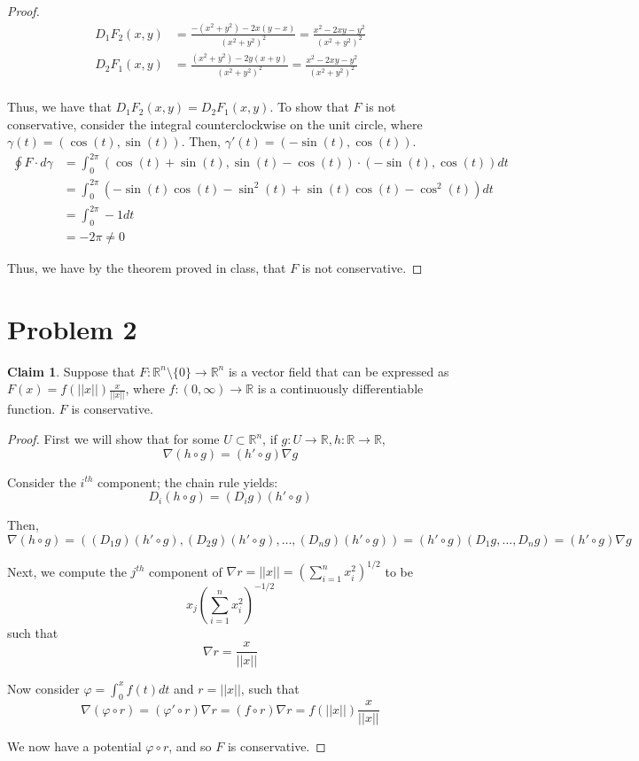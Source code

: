 \documentclass[12pt,letterpaper]{article}
\theoremstyle{definition}
\newtheorem*{claim}{Claim}
\newcommand{\R}{\mathbb{R}}
\begin{document}
\begin{proof}
  \begin{align*}
    D_1F_2(x,y) &= \frac{-(x^2 + y^2) - 2x(y-x)}{(x^2 + y^2)^2} = \frac{x^2 -2xy - y^2}{(x^2 + y^2)^2} \\
    D_2F_1(x,y) &= \frac{(x^2 + y^2) - 2y(x+y)}{(x^2 + y^2)^2} = \frac{x^2 - 2xy - y^2}{(x^2 + y^2)^2} \\
  \end{align*}

  Thus, we have that $D_1F_2(x,y) = D_2F_1(x,y)$. To show that $F$ is not
  conservative, consider the integral counterclockwise on the unit circle, where
  $\gamma(t) = (\cos(t), \sin(t))$. Then, $\gamma'(t) = (-\sin(t), \cos(t))$.
  \begin{align*}
    \oint F \cdot d\gamma &= \int_0^{2\pi} (\cos(t) + \sin(t), \sin(t) - \cos(t)) \cdot (-\sin(t), \cos(t)) dt \\
                          &= \int_0^{2\pi} (-\sin(t)\cos(t) - \sin^2(t) + \sin(t)\cos(t) - \cos^2(t))dt \\
                          &= \int_0^{2\pi} -1 dt \\
                          &= -2\pi \neq 0
  \end{align*}

  Thus, we have by the theorem proved in class, that $F$ is not conservative.
\end{proof}

\section*{Problem 2}

\begin{claim}
  Suppose that $F: \R^n \setminus \{0\} \rightarrow \R^n$ is a vector field that
  can be expressed as $F(x) = f(||x||)\frac{x}{||x||}$, where $f:(0,\infty)
  \rightarrow \R$ is a continuously differentiable function. $F$ is conservative. 
\end{claim}

\begin{proof}
  First we will show that for some $U \subset \R^n$, if $g: U \rightarrow \R, h:
  \R \rightarrow \R$,
  \[
    \nabla (h \circ g) = (h'\circ g)\nabla g
  \]

  Consider the $i^{th}$ component; the chain rule yields:
  \[
    D_i(h \circ g) = (D_ig)(h' \circ g)
  \]

  Then,
  \[
    \nabla (h \circ g) = ((D_1g)(h' \circ g), (D_2g)(h' \circ g), \dots,
    (D_ng)(h'\circ g)) = (h'\circ g)(D_1g, \dots, D_ng) = (h'\circ g)\nabla g
  \]

  Next, we compute the $j^{th}$ component of $\nabla r = ||x|| = \left( \sum_{i=1}^nx_i^2 \right)^{1/2}$ to be
  \[
    x_j\left( \sum_{i=1}^nx_i^2 \right)^{-1/2}
  \]
  such that
  \[
    \nabla r = \frac{x}{||x||}
  \]
  
  Now consider $\varphi = \int_0^xf(t)dt$ and $r = ||x||$, such that 
  \[
    \nabla (\varphi \circ r) = (\varphi' \circ r) \nabla r = (f \circ r)\nabla r
    = f(||x||)\frac{x}{||x||}
  \]

  We now have a potential $\varphi \circ r$, and so $F$ is conservative.
\end{proof}
\end{document}
